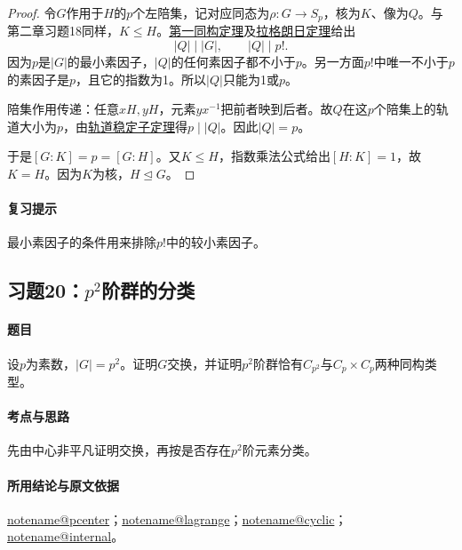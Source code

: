 \documentclass[UTF8,a4paper,11pt,fontset=windows]{ctexart}
\makeatletter
\newcommand{\noteref}[1]{\hyperref[note:#1]{\csname notename@#1\endcsname}}
\newcommand{\proofref}[2]{\hyperref[note:#1]{#2}}
\newcommand{\exref}[2]{\hyperref[ex:#1:#2]{第#1章习题#2}}
\makeatother
\begin{document}
\begin{proof}
令$G$作用于$H$的$p$个左陪集，记对应同态为$\rho:G\to S_p$，核为$K$、像为$Q$。与第二章习题18同样，$K\leq H$。\proofref{firstiso}{第一同构定理}及\proofref{lagrange}{拉格朗日定理}给出
\[
|Q|\mid|G|,\qquad |Q|\mid p!.
\]
因为$p$是$|G|$的最小素因子，$|Q|$的任何素因子都不小于$p$。另一方面$p!$中唯一不小于$p$的素因子是$p$，且它的指数为1。所以$|Q|$只能为1或$p$。

陪集作用传递：任意$xH,yH$，元素$yx^{-1}$把前者映到后者。故$Q$在这$p$个陪集上的轨道大小为$p$，由\proofref{orbit}{轨道稳定子定理}得$p\mid|Q|$。因此$|Q|=p$。

于是$[G:K]=p=[G:H]$。又$K\leq H$，指数乘法公式给出$[H:K]=1$，故$K=H$。因为$K$为核，$H\trianglelefteq G$。
\end{proof}

\paragraph{复习提示}
最小素因子的条件用来排除$p!$中的较小素因子。


\subsection{习题20：\texorpdfstring{$p^2$阶群的分类}{p2阶群的分类}}
\label{ex:2:20}

\paragraph{题目}
设$p$为素数，$|G|=p^2$。证明$G$交换，并证明$p^2$阶群恰有$C_{p^2}$与$C_p\times C_p$两种同构类型。

\paragraph{考点与思路}
先由中心非平凡证明交换，再按是否存在$p^2$阶元素分类。

\paragraph{所用结论与原文依据}
\noteref{pcenter}；\noteref{lagrange}；\noteref{cyclic}；\noteref{internal}。

\end{document}
